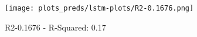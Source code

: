 
\begin{figure}[H]
    \centering
    \texttt{[image: plots\_preds/lstm-plots/R2-0.1676.png]}
    \caption{R2-0.1676 - R-Squared: 0.17}
\end{figure}
